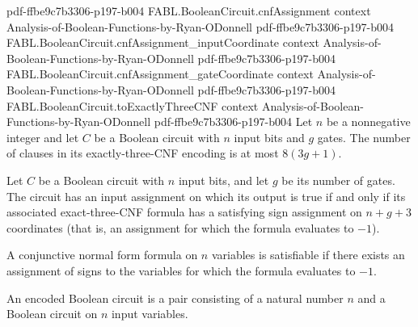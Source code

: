 \begin{theorem}
  {pdf-ffbe9c7b3306-p197-b004}
\proofstep
  {FABL.BooleanCircuit.cnfAssignment}
  {context}
  {Analysis-of-Boolean-Functions-by-Ryan-ODonnell}
  {pdf-ffbe9c7b3306-p197-b004}
\proofstep
  {FABL.BooleanCircuit.cnfAssignment_inputCoordinate}
  {context}
  {Analysis-of-Boolean-Functions-by-Ryan-ODonnell}
  {pdf-ffbe9c7b3306-p197-b004}
\proofstep
  {FABL.BooleanCircuit.cnfAssignment_gateCoordinate}
  {context}
  {Analysis-of-Boolean-Functions-by-Ryan-ODonnell}
  {pdf-ffbe9c7b3306-p197-b004}
\proofstep
  {FABL.BooleanCircuit.toExactlyThreeCNF}
  {context}
  {Analysis-of-Boolean-Functions-by-Ryan-ODonnell}
  {pdf-ffbe9c7b3306-p197-b004}
Let $n$ be a nonnegative integer and let $C$ be a Boolean circuit with $n$ input bits
and $g$ gates. The number of clauses in its exactly-three-CNF encoding is at most
$8(3g+1)$.
\end{theorem}

\begin{theorem}
\label{FABL.BooleanCircuit.satisfiable_iff_toExactlyThreeCNF_satisfiable}
\leanok
{}
Let $C$ be a Boolean circuit with $n$ input bits, and let $g$ be its number of gates.
The circuit has an input assignment on which its output is true if and only if its
associated exact-three-CNF formula has a satisfying sign assignment on $n+g+3$
coordinates (that is, an assignment for which the formula evaluates to $-1$).
\end{theorem}

\begin{definition}
\label{FABL.CNFFormula.Satisfiable}
\leanok
{}
A conjunctive normal form formula on $n$ variables is satisfiable if there exists an
assignment of signs to the variables for which the formula evaluates to $-1$.
\end{definition}

\begin{definition}
\label{FABL.EncodedBooleanCircuit}
\leanok
{}
An encoded Boolean circuit is a pair consisting of a natural number $n$ and a Boolean
circuit on $n$ input variables.
\end{definition}

